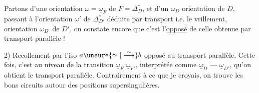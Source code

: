 Partons d'une orientation $\omega=\underline\omega_F$ de $F=\Delta_D^*$, et d'un $\omega_D$ orientation de $D$, passant à l'orientation $\omega'$ de $\Delta_{D'}^*$ déduite par transport i.e. le vrillement,  orientation $\omega_{D'}$ de $D'$, on constate encore que c'est l'\uline{opposé} de celle obtenue par transport parallèle !



2) Recollement par l'iso $a\unsure{\simeq|\overset{\sim}{\longrightarrow}}b$ opposé au transport parallèle. Cette fois, c'est au niveau de la transition $\underline\omega_F$ \unsure{---,|---|\ensuremath{\to}} $\underline\omega_{F'}$, interprétée comme $\underline\omega_D$ --- $\underline\omega_{D'}$, qu'on obtient le transport parallèle. Contrairement à ce que je croyais,  on trouve les bons circuits autour des positions supersingulières.
